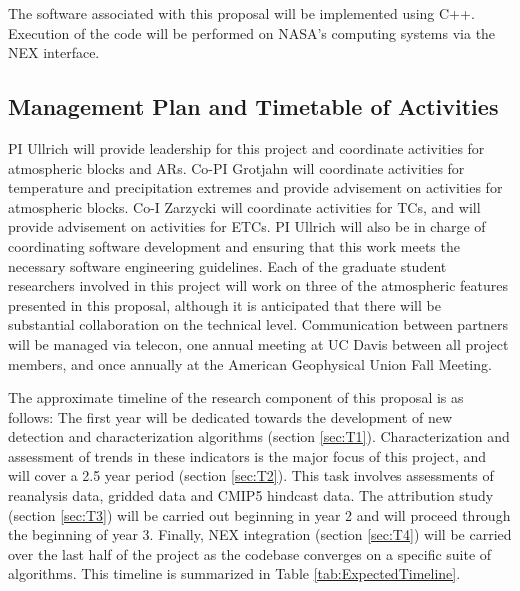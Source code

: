 \documentclass[11pt]{article}
\begin{document}
The software associated with this proposal will be implemented using C++.  Execution of the code will be performed on NASA's computing systems via the NEX interface.




\subsection{Management Plan and Timetable of Activities} \label{sec:Timeline}

PI Ullrich will provide leadership for this project and coordinate activities for atmospheric blocks and ARs.  Co-PI Grotjahn will coordinate activities for temperature and precipitation extremes and provide advisement on activities for atmospheric blocks.  Co-I Zarzycki will coordinate activities for TCs, and will provide advisement on activities for ETCs.  PI Ullrich will also be in charge of coordinating software development and ensuring that this work meets the necessary software engineering guidelines.  Each of the graduate student researchers involved in this project will work on three of the atmospheric features presented in this proposal, although it is anticipated that there will be substantial collaboration on the technical level.  Communication between partners will be managed via telecon, one annual meeting at UC Davis between all project members, and once annually at the American Geophysical Union Fall Meeting.

The approximate timeline of the research component of this proposal is as follows:  The first year will be dedicated towards the development of new detection and characterization algorithms (section \ref{sec:T1}).  Characterization and assessment of trends in these indicators is the major focus of this project, and will cover a 2.5 year period (section \ref{sec:T2}).  This task involves assessments of reanalysis data, gridded data and CMIP5 hindcast data.  The attribution study (section \ref{sec:T3}) will be carried out beginning in year 2 and will proceed through the beginning of year 3.  Finally, NEX integration (section \ref{sec:T4}) will be carried over the last half of the project as the codebase converges on a specific suite of algorithms.  This timeline is summarized in Table \ref{tab:ExpectedTimeline}.
\end{document}
